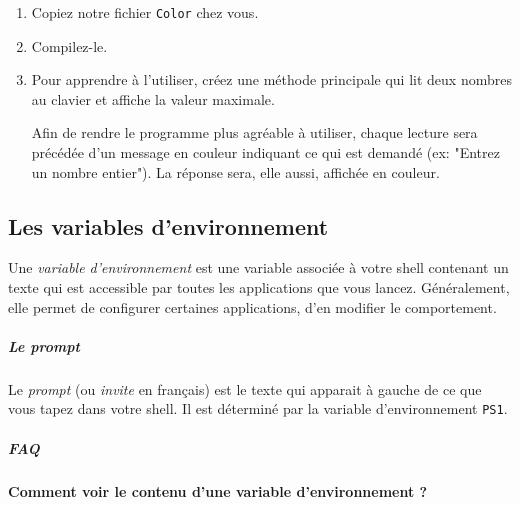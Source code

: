 \documentclass[a4paper,11pt]{article}
\begin{document}
			
		\begin{Exercice}{}
		
			\begin{enumerate}
				
				\item Copiez notre fichier \verb_Color_ chez vous.
				
				\item Compilez-le.
				
				\item Pour apprendre \`a l'utiliser, cr\'eez une m\'ethode principale
					qui lit deux nombres au clavier et affiche la valeur maximale.
					\par
				
					Afin de rendre le programme plus agr\'eable \`a utiliser, chaque lecture sera pr\'ec\'ed\'ee
					d'un message en couleur indiquant ce qui est demand\'e (ex: "Entrez un nombre entier").
					La r\'eponse sera, elle aussi, affich\'ee en couleur.
				
			\end{enumerate}
		\end{Exercice}
        
			

	\subsection{Les variables d'environnement}
		Une \textit{variable d'environnement} est une variable associ\'ee \`a votre shell contenant un texte qui est accessible par toutes
		les applications que vous lancez. G\'en\'eralement, elle permet de configurer certaines applications, d'en modifier le comportement.
			
            \par
        
			
		\subparagraph{Le prompt} 
		
	         	\par
        
			Le \textit{prompt} (ou \textit{invite} en fran\c cais) est le texte qui apparait \`a gauche
			de ce que vous tapez dans votre shell. Il est d\'etermin\'e par la variable d'environnement \verb_PS1_.
			
            		\par
        
			
		\subparagraph{FAQ} 
           		\par
        			\textbf{Comment voir le contenu d'une variable d'environnement ?}
           		 \par
        
\end{document}
